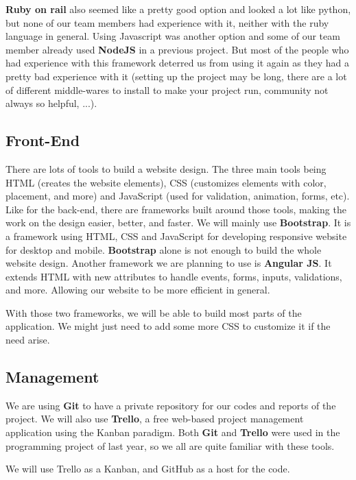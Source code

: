 \textbf{Ruby on rail} also seemed like a pretty good option and looked a lot like python, but none of our team members had experience with it, neither with the ruby language in general. Using Javascript was another option and some of our team member already used \textbf{NodeJS} in a previous project. But most of the people who had experience with this framework deterred us from using it again as they had a pretty bad experience with it (setting up the project may be long, there are a lot of different middle-wares to install to make your project run, community not always so helpful, ...).

\subsection{Front-End}

There are lots of tools to build a website design. The three main tools being HTML (creates the website elements), CSS (customizes elements with color, placement, and more) and JavaScript (used for validation, animation, forms, etc). Like for the back-end, there are frameworks built around those tools, making the work on the design easier, better, and faster. We will mainly use \textbf{Bootstrap}. It is a framework using HTML, CSS and JavaScript for developing responsive website for desktop and mobile. \textbf{Bootstrap} alone is not enough to build the whole website design. Another framework we are planning to use is \textbf{Angular JS}. It extends HTML with new attributes to handle events, forms, inputs, validations, and more. Allowing our website to be more efficient in general. \newline

With those two frameworks, we will be able to build most parts of the application. We might just need to add some more CSS to customize it if the need arise.

\subsection{Management}

We are using \textbf{Git} to have a private repository for our codes and reports of the project. We will also use \textbf{Trello}, a free web-based project management application using the Kanban paradigm. Both \textbf{Git} and \textbf{Trello} were used in the programming project of last year, so we all are quite familiar with these tools.

We will use Trello as a Kanban, and GitHub as a host for the code. \newline
